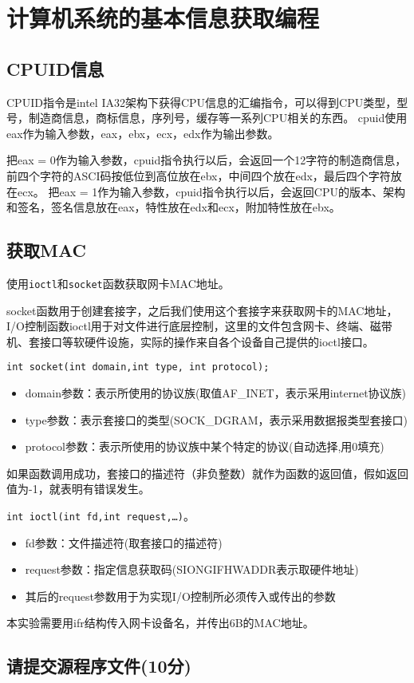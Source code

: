 \section{计算机系统的基本信息获取编程}
\subsection{CPUID信息}
CPUID指令是intel IA32架构下获得CPU信息的汇编指令，可以得到CPU类型，型号，制造商信息，商标信息，序列号，缓存等一系列CPU相关的东西。
cpuid使用eax作为输入参数，eax，ebx，ecx，edx作为输出参数。

把eax = 0作为输入参数，cpuid指令执行以后，会返回一个12字符的制造商信息，前四个字符的ASCI码按低位到高位放在ebx，中间四个放在edx，最后四个字符放在ecx。
把eax = 1作为输入参数，cpuid指令执行以后，会返回CPU的版本、架构和签名，签名信息放在eax，特性放在edx和ecx，附加特性放在ebx。

\subsection{获取MAC}
使用\lstinline|ioctl|和\lstinline|socket|函数获取网卡MAC地址。

socket函数用于创建套接字，之后我们使用这个套接字来获取网卡的MAC地址，I/O控制函数ioctl用于对文件进行底层控制，这里的文件包含网卡、终端、磁带机、套接口等软硬件设施，实际的操作来自各个设备自己提供的ioctl接口。

\lstinline|int socket(int domain,int type, int protocol);|
\begin{itemize}
	\item domain参数：表示所使用的协议族(取值AF\_INET，表示采用internet协议族)
	\item type参数：表示套接口的类型(SOCK\_DGRAM，表示采用数据报类型套接口)
	\item protocol参数：表示所使用的协议族中某个特定的协议(自动选择,用0填充)
\end{itemize}

如果函数调用成功，套接口的描述符（非负整数）就作为函数的返回值，假如返回值为-1，就表明有错误发生。

\lstinline|int ioctl(int fd,int request,…)|。
\begin{itemize}
	\item fd参数：文件描述符(取套接口的描述符)
	\item request参数：指定信息获取码(SIONGIFHWADDR表示取硬件地址)
	\item 其后的request参数用于为实现I/O控制所必须传入或传出的参数
\end{itemize}

本实验需要用ifr结构传入网卡设备名，并传出6B的MAC地址。

\subsection{请提交源程序文件(10分)} 

